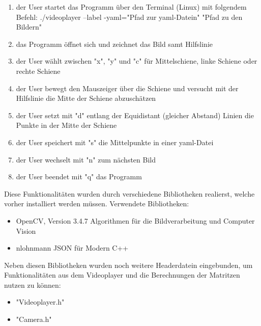 \documentclass[11pt]{scrartcl}
\begin{document}
\begin{enumerate}
	\item der User startet das Programm über den Terminal (Linux) mit folgendem Befehl: ./videoplayer --label -yaml="Pfad zur yaml-Datein" "Pfad zu den Bildern"
	\item das Programm öffnet sich und zeichnet das Bild samt Hilfslinie
	\item der User wählt zwischen "x", "y" und "c" für Mittelschiene, linke Schiene oder rechte Schiene
	\item der User bewegt den Mauszeiger über die Schiene und versucht mit der Hilfslinie die Mitte der Schiene abzuschätzen
	\item der User setzt mit "d" entlang der Equidistant (gleicher Abstand) Linien die Punkte in der Mitte der Schiene
	\item der User speichert mit "s" die Mittelpunkte in einer yaml-Datei
	\item der User wechselt mit "n" zum nächsten Bild
	\item der User beendet mit "q" das Programm
\end{enumerate}
\noindent
Diese Funktionalitäten wurden durch verschiedene Bibliotheken realierst, welche vorher installiert werden müssen. 
Verwendete Bibliotheken:

\begin{itemize}
	\item OpenCV, Version 3.4.7 Algorithmen für die Bildverarbeitung und Computer Vision
	\item nlohnmann JSON für Modern C++
\end{itemize}

Neben diesen Bibliotheken wurden noch weitere Headerdatein eingebunden, um Funktionalitäten aus dem Videoplayer und die Berechnungen der Matritzen nutzen zu können:

\begin{itemize}
	\item "Videoplayer.h"
	\item "Camera.h"
\end{itemize}
\end{document}
